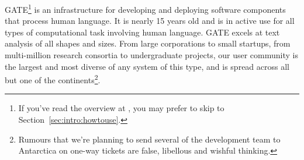 %
%
%
%
%
%
%

GATE\footnote{If you've read
the overview at , 
you may prefer to skip to Section~\ref{sec:intro:howtouse}.} is an
infrastructure for developing and deploying software components that
process human language. It is nearly 15 years old and is in active use
for all types of computational task involving human language. GATE
excels at text analysis of all shapes and sizes. From large
corporations to small startups, from \texteuro multi-million research
consortia to undergraduate projects, our user community is the largest
and most diverse of any system of this type, and is spread across all
but one of the continents\footnote{Rumours that we're planning to send
several of the development team to Antarctica on one-way tickets are
false, libellous and wishful thinking.}.

